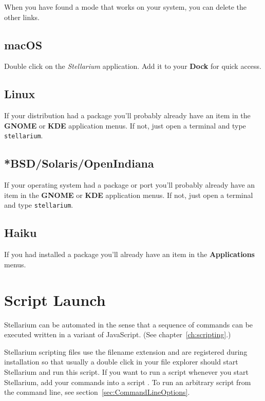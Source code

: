 When you have found a mode that works on your system, you can delete
the other links.

\subsection{macOS}
\label{sec:GettingStarted:Running:macOS}

Double click on the \emph{Stellarium} application.  Add it to your
\textbf{Dock} for quick access.

\subsection{Linux}
\label{sec:GettingStarted:Running:Linux}

If your distribution had a package you'll probably already have an
item in the \textbf{GNOME} or \textbf{KDE} application menus. If not, just open a
terminal and type \texttt{stellarium}.

\subsection{*BSD/Solaris/OpenIndiana}
\label{sec:GettingStarted:Running:UNIX}

If your operating system had a package or port you'll probably 
already have an item in the \textbf{GNOME} or \textbf{KDE} application menus. 
If not, just open a terminal and type \texttt{stellarium}.

\subsection{Haiku}
\label{sec:GettingStarted:Running:Haiku}

If you had installed a package you'll already have an
item in the \textbf{Applications} menus.

\section{Script Launch}
\label{sec:GettingStarted:Scripting}

Stellarium can be automated in the sense that a sequence of commands can be executed written in a variant of JavaScript. (See chapter~\ref{ch:scripting}.)

Stellarium scripting files use the filename extension  and are registered during installation so that usually 
a double click in your file explorer should start Stellarium and run this script. 
If you want to run a script whenever you start Stellarium, add your commands into a script . 
To run an arbitrary script from the command line, see section~\ref{sec:CommandLineOptions}. 

